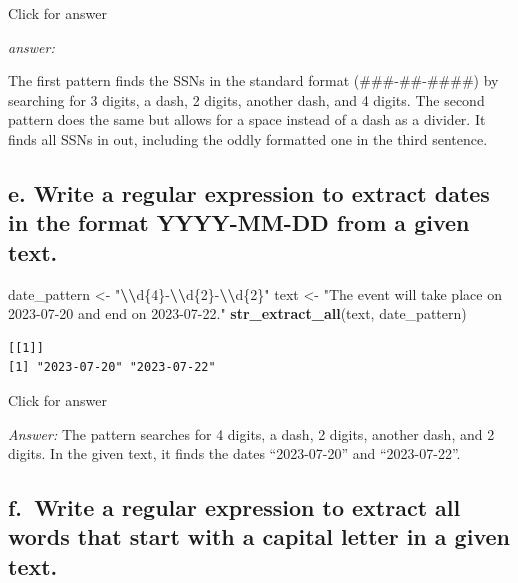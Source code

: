 \documentclass[
]{book}
\newenvironment{Shaded}{\begin{snugshade}}{\end{snugshade}}
\newcommand{\FunctionTok}[1]{\textcolor[rgb]{0.13,0.29,0.53}{\textbf{#1}}}
\newcommand{\NormalTok}[1]{#1}
\newcommand{\OtherTok}[1]{\textcolor[rgb]{0.56,0.35,0.01}{#1}}
\newcommand{\SpecialCharTok}[1]{\textcolor[rgb]{0.81,0.36,0.00}{\textbf{#1}}}
\newcommand{\StringTok}[1]{\textcolor[rgb]{0.31,0.60,0.02}{#1}}
\begin{document}
Click for answer

\emph{answer:}

The first pattern finds the SSNs in the standard format (\#\#\#-\#\#-\#\#\#\#) by searching for 3 digits, a dash, 2 digits, another dash, and 4 digits. The second pattern does the same but allows for a space instead of a dash as a divider. It finds all SSNs in out, including the oddly formatted one in the third sentence.

\hypertarget{e.-write-a-regular-expression-to-extract-dates-in-the-format-yyyy-mm-dd-from-a-given-text.}{%
\subsection{e. Write a regular expression to extract dates in the format YYYY-MM-DD from a given text.}\label{e.-write-a-regular-expression-to-extract-dates-in-the-format-yyyy-mm-dd-from-a-given-text.}}

\begin{Shaded}
\begin{Highlighting}[]
\NormalTok{date\_pattern }\OtherTok{\textless{}{-}} \StringTok{"}\SpecialCharTok{\textbackslash{}\textbackslash{}}\StringTok{d\{4\}{-}}\SpecialCharTok{\textbackslash{}\textbackslash{}}\StringTok{d\{2\}{-}}\SpecialCharTok{\textbackslash{}\textbackslash{}}\StringTok{d\{2\}"}
\NormalTok{text }\OtherTok{\textless{}{-}} \StringTok{"The event will take place on 2023{-}07{-}20 and end on 2023{-}07{-}22."}
\FunctionTok{str\_extract\_all}\NormalTok{(text, date\_pattern)}
\end{Highlighting}
\end{Shaded}

\begin{verbatim}
[[1]]
[1] "2023-07-20" "2023-07-22"
\end{verbatim}

Click for answer

\emph{Answer:} The pattern searches for 4 digits, a dash, 2 digits, another dash, and 2 digits. In the given text, it finds the dates ``2023-07-20'' and ``2023-07-22''.

\hypertarget{f.-write-a-regular-expression-to-extract-all-words-that-start-with-a-capital-letter-in-a-given-text.}{%
\subsection{f.~Write a regular expression to extract all words that start with a capital letter in a given text.}\label{f.-write-a-regular-expression-to-extract-all-words-that-start-with-a-capital-letter-in-a-given-text.}}
\end{document}
